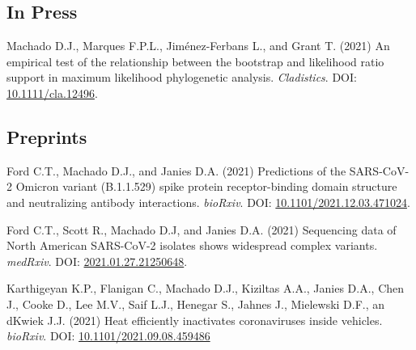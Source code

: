 \subsection{In Press}

	{
		\setlength{\parskip}{.5em}\renewcommand{\baselinestretch}{2.0}
		\begin{hangparas}{.25in}{1}
		
		
        Machado D.J., Marques F.P.L., Jiménez-Ferbans L., and Grant T. (2021) An empirical test of the relationship between the bootstrap and likelihood ratio support in maximum likelihood phylogenetic analysis. \textit{Cladistics}. DOI: \href{https://doi.org/10.1111/cla.12496}{10.1111/cla.12496}.

		\end{hangparas}
	}

\subsection{Preprints}

	{
		\setlength{\parskip}{.5em}\renewcommand{\baselinestretch}{2.0}
		\begin{hangparas}{.25in}{1}
		
		
		Ford C.T., Machado D.J., and Janies D.A. (2021) Predictions of the SARS-CoV-2 Omicron variant (B.1.1.529) spike protein receptor-binding domain structure and neutralizing antibody interactions. \textit{bioRxiv}. DOI: \href{https://doi.org/10.1101/2021.12.03.471024}{10.1101/2021.12.03.471024}.
		
		Ford C.T., Scott R.,  Machado D.J, and  Janies D.A. (2021) Sequencing data of North American SARS-CoV-2 isolates shows widespread complex variants. \textit{medRxiv}. DOI: \href{https://doi.org/10.1101/2021.01.27.21250648}{2021.01.27.21250648}.
		
		Karthigeyan K.P., Flanigan C., Machado D.J., Kiziltas A.A., Janies D.A., Chen J., Cooke D., Lee M.V., Saif L.J., Henegar S., Jahnes J., Mielewski D.F., an dKwiek J.J. (2021) Heat efficiently inactivates coronaviruses inside vehicles. \textit{bioRxiv}. DOI: \href{https://doi.org/10.1101/2021.09.08.459486}{10.1101/2021.09.08.459486}
		
		\end{hangparas}
	}